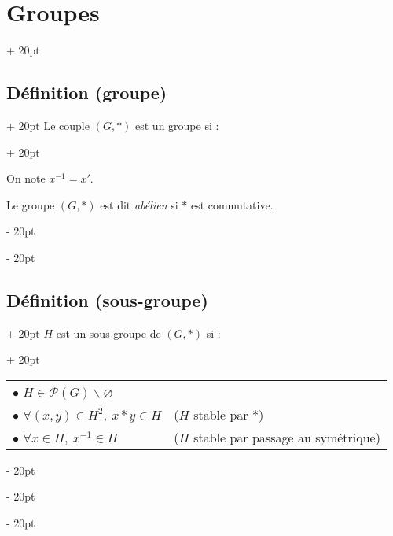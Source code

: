 \documentclass[a4paper, 12pt, twoside]{article}
\newcommand{\ind}[1][20pt]{\advance\leftskip + #1}
\newcommand{\deind}[1][20pt]{\advance\leftskip - #1}
\newenvironment{indentedenv}[1][20pt]{\par \ind[#1]}{\par \deind}
\newenvironment{indt}[2][20pt]{#2 \begin{indentedenv}[#1]}{\end{indentedenv}} %
\begin{document}
\begin{indt}{\section{Groupes}}
\begin{indt}{\subsection{Définition (groupe)}}
\begin{indt}{Le couple $(G, *)$ est un groupe si :}
                \vspace{12pt}
                
                On note $x^{-1} = x'$.
                
                Le groupe $(G, *)$ est dit \textit{abélien} si $*$ est commutative.
            \end{indt}
        \end{indt}
        
        \vspace{6pt}
        
        \begin{indt}{\subsection{Définition (sous-groupe)}}
            \begin{indt}{$H$ est un sous-groupe de $(G, *)$ si :}
                \begin{tabular}{ll}
                    $\bullet$ $H \in \mathcal P(G) \backslash \varnothing$
                    \vspace{6pt}
                    \\
                    $\bullet$ $\forall (x, y) \in H^2,\ x * y \in H$
                    & ($H$ stable par $*$)
                    \vspace{6pt}
                    \\
                    $\bullet$ $\forall x \in H,\ x^{-1} \in H$
                    & ($H$ stable par passage au symétrique)
                \end{tabular}
            \end{indt}
        \end{indt}
    \end{indt}
    
    \vspace{6pt}
    
\end{document}

